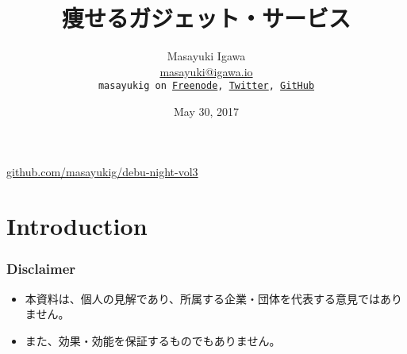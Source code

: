 \documentclass[aspectratio=169,11pt,hyperref={colorlinks=true}]{beamer}
\author[Masayuki Igawa]{%
  \texorpdfstring{%
    \centering
    Masayuki Igawa\\
    \href{mailto:masayuki@igawa.io}{masayuki@igawa.io}\\
    \texttt{masayukig on \href{http://freenode.net/}{Freenode},
     \href{https://twitter.com/masayukig}{Twitter},
     \href{https://github.com/masayukig}{GitHub}}
  }
  {Masayuki Igawa}
}
\date{May 30, 2017}
\title[痩せるガジェット・サービス
\hspace{2em}\insertframenumber/\inserttotalframenumber]{痩せるガジェット・サービス}
\begin{document}
{%
\begin{frame}[noframenumbering]
  \hypersetup{colorlinks,urlcolor=suse}
  \titlepage{}
  \centering
  \@place \par
  \href{https://github.com/masayukig/debu-night-vol3}{github.com/masayukig/debu-night-vol3}
\end{frame}
}


\section{Introduction}
\begin{frame}
  \frametitle{Disclaimer}
  \begin{itemize}
    \item 本資料は、個人の見解であり、所属する企業・団体を代表する意見ではありません。
    \item また、効果・効能を保証するものでもありません。
  \end{itemize}
\end{frame}
\end{document}
